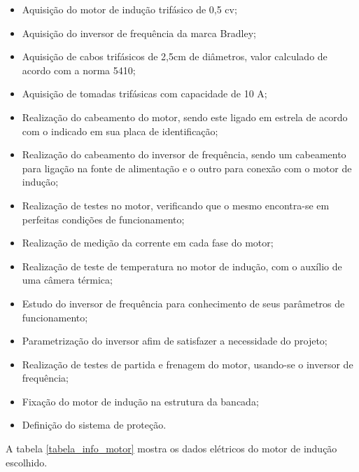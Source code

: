 \begin{itemize}
\item Aquisição do motor de indução trifásico de 0,5 cv;
\item Aquisição do inversor de frequência da marca Bradley;
\item Aquisição de cabos trifásicos de 2,5cm de diâmetros, valor calculado de acordo com a norma 5410;
\item Aquisição de tomadas trifásicas com capacidade de 10 A;
\item Realização do cabeamento do motor, sendo este ligado em estrela de acordo com o indicado em sua placa de identificação;
\item Realização do cabeamento do inversor de frequência, sendo um cabeamento para ligação na fonte de alimentação e o outro para conexão com o motor de indução;
\item Realização de testes no motor, verificando que o mesmo encontra-se em perfeitas condições de funcionamento;
\item Realização de medição da corrente em cada fase do motor;
\item Realização de teste de temperatura no motor de indução, com o auxílio de uma câmera térmica;
\item Estudo do inversor de frequência para conhecimento de seus parâmetros de funcionamento;
\item Parametrização do inversor afim de satisfazer a necessidade do projeto;
\item Realização de testes de partida e frenagem do motor, usando-se o inversor de frequência;
\item Fixação do motor de indução na estrutura da bancada;
\item Definição do sistema de proteção.
\end{itemize}


A tabela \ref{tabela_info_motor} mostra os dados elétricos do motor de indução escolhido.

